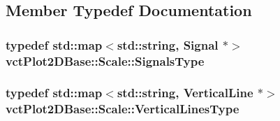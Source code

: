 \subsection{Member Typedef Documentation}
\hypertarget{classvct_plot2_d_base_1_1_scale_aecdc247557c6ec3b7976596b42a4bc27}{
\subsubsection[{Signals\-Type}]{\setlength{\rightskip}{0pt plus 5cm}typedef std\-::map$<$std\-::string, {\bf Signal} $\ast$$>$ {\bf vct\-Plot2\-D\-Base\-::\-Scale\-::\-Signals\-Type}}}\label{classvct_plot2_d_base_1_1_scale_aecdc247557c6ec3b7976596b42a4bc27}
\hypertarget{classvct_plot2_d_base_1_1_scale_acd4d4d528f1381dfd1145ceec34b25ba}{
\subsubsection[{Vertical\-Lines\-Type}]{\setlength{\rightskip}{0pt plus 5cm}typedef std\-::map$<$std\-::string, {\bf Vertical\-Line} $\ast$$>$ {\bf vct\-Plot2\-D\-Base\-::\-Scale\-::\-Vertical\-Lines\-Type}}}\label{classvct_plot2_d_base_1_1_scale_acd4d4d528f1381dfd1145ceec34b25ba}


